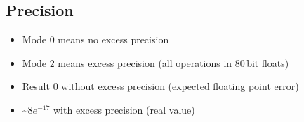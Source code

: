 \subsection{Precision}
\begin{itemize}
	\item Mode $0$ means no excess precision
	\item Mode $2$ means excess precision (all operations in $80$\,bit floats)
\end{itemize}
\begin{itemize}
	\item Result $0$ without excess precision (expected floating point error)
	\item \textasciitilde$8e^{-17}$ with excess precision (real value)
\end{itemize}
